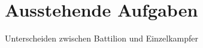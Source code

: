 \chapter{Ausstehende Aufgaben}
\hypertarget{todo}{}\label{todo}

\begin{DoxyRefList}
\item[Class \doxylink{classAuswahl}{Auswahl} ]\label{todo__todo000001}%
%
Unterscheiden zwischen Battilion und Einzelkampfer 
\end{DoxyRefList}